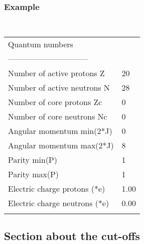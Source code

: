 \documentclass[a4paper,11pt]{article}
\begin{document}
\subsubsection*{Example}
\begin{center}
\tt
\begin{tabular}{|ll|}
\hline
Quantum numbers                &      \\
------------------------------ &      \\
Number of active protons  Z    &20    \\
Number of active neutrons N    &28    \\
Number of core protons  Zc     &0     \\
Number of core neutrons Nc     &0     \\
Angular momentum min(2*J)      &0     \\
Angular momentum max(2*J)      &8     \\
Parity min(P)                  &1     \\
Parity max(P)                  &1     \\
Electric charge protons\phantom{ } (*e)  &1.00  \\
Electric charge neutrons (*e)  &0.00  \\
                               &      \\
\hline
\end{tabular}
\end{center}

%
%
\subsection{Section about the cut-offs}
\end{document}
